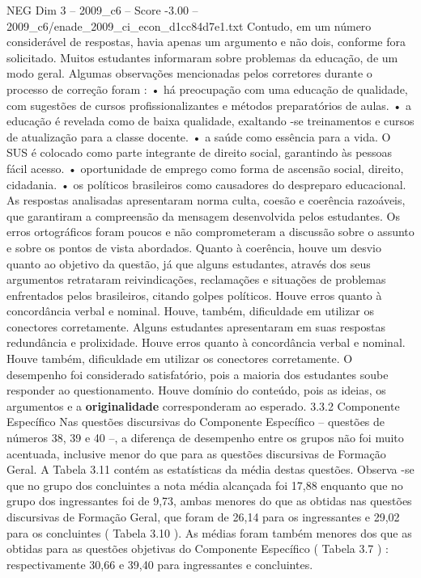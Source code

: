 \begin{textsample}{NEG Dim 3 – 2009\_c6 – Score -3.00 – 2009\_c6/enade\_2009\_ci\_econ\_d1cc84d7e1.txt}
Contudo, em um número considerável de respostas, havia apenas um argumento e não dois, conforme fora solicitado.
Muitos estudantes informaram sobre problemas da educação, de um modo geral.
Algumas observações mencionadas pelos corretores durante o processo de correção foram : • há preocupação com uma educação de qualidade, com sugestões de cursos profissionalizantes e métodos preparatórios de aulas. • a educação é revelada como de baixa qualidade, exaltando -se treinamentos e cursos de atualização para a classe docente. • a saúde como essência para a vida.
O SUS é colocado como parte integrante de direito social, garantindo às pessoas fácil acesso. • oportunidade de emprego como forma de ascensão social, direito, cidadania. • os políticos brasileiros como causadores do despreparo educacional.
As respostas analisadas apresentaram norma culta, coesão e coerência razoáveis, que garantiram a compreensão da mensagem desenvolvida pelos estudantes.
Os erros ortográficos foram poucos e não comprometeram a discussão sobre o assunto e sobre os pontos de vista abordados.
Quanto à coerência, houve um desvio quanto ao objetivo da questão, já que alguns estudantes, através dos seus argumentos retrataram reivindicações, reclamações e situações de problemas enfrentados pelos brasileiros, citando golpes políticos.
Houve erros quanto à concordância verbal e nominal.
Houve, também, dificuldade em utilizar os conectores corretamente.
Alguns estudantes apresentaram em suas respostas redundância e prolixidade.
Houve erros quanto à concordância verbal e nominal.
Houve também, dificuldade em utilizar os conectores corretamente.
O desempenho foi considerado satisfatório, pois a maioria dos estudantes soube responder ao questionamento.
Houve domínio do conteúdo, pois as ideias, os argumentos e a \textbf{originalidade} corresponderam ao esperado. 3.3.2 Componente Específico Nas questões discursivas do Componente Específico – questões de números 38, 39 e 40 –, a diferença de desempenho entre os grupos não foi muito acentuada, inclusive menor do que para as questões discursivas de Formação Geral.
A Tabela 3.11 contém as estatísticas da média destas questões.
Observa -se que no grupo dos concluintes a nota média alcançada foi 17,88 enquanto que no grupo dos ingressantes foi de 9,73, ambas menores do que as obtidas nas questões discursivas de Formação Geral, que foram de 26,14 para os ingressantes e 29,02 para os concluintes ( Tabela 3.10 ).
As médias foram também menores dos que as obtidas para as questões objetivas do Componente Específico ( Tabela 3.7 ) : respectivamente 30,66 e 39,40 para ingressantes e concluintes.

\end{textsample}
